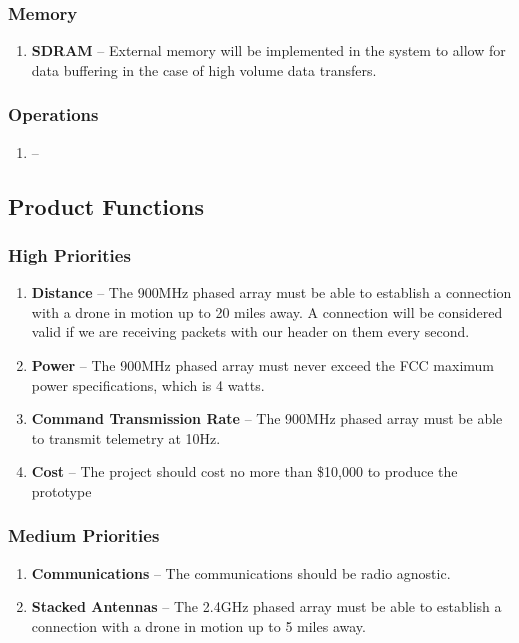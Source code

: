 \documentclass[ProjectRequirements.tex]{subfiles}
\begin{document}
		\subsubsection{Memory}
			\begin{enumerate}\itemsep1pt
				\item \textbf{SDRAM} -- External memory will be implemented in the system to allow for data buffering in the case of high volume data transfers.  
			\end{enumerate}
		
		\subsubsection{Operations}
			\begin{enumerate}\itemsep1pt
				\item \textbf{} --
			\end{enumerate}
		
	\subsection{Product Functions}
	
		\subsubsection{High Priorities}
			\begin{enumerate}
				\item \textbf{Distance} -- The 900MHz phased array must be able to establish a connection with a drone in motion up to 20 miles away. A connection will be considered valid if we are receiving packets with our header on them every second.
				\item \textbf{Power} -- The 900MHz phased array must never exceed the FCC maximum power specifications, which is 4 watts.
				\item \textbf{Command Transmission Rate} -- The 900MHz phased array must be able to transmit telemetry at 10Hz.
				\item \textbf{Cost} -- The project should cost no more than \$10,000 to produce the prototype
							
			\end{enumerate}
		
		\subsubsection{Medium Priorities}
			\begin{enumerate}
				\item \textbf{Communications} -- The communications should be radio agnostic.
				\item \textbf{Stacked Antennas} -- The 2.4GHz phased array must be able to establish a connection with a drone in motion up to 5 miles away.
			\end{enumerate}
		
\end{document}
